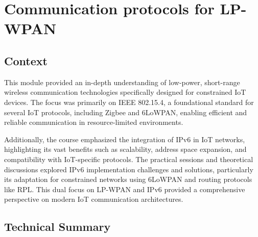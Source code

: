 \section{Communication protocols for LP-WPAN}
\subsection{Context}

\indent \indent This module provided an in-depth understanding of low-power, short-range wireless communication technologies specifically designed for constrained IoT devices. The focus was primarily on IEEE 802.15.4, a foundational standard for several IoT protocols, including Zigbee and 6LoWPAN, enabling efficient and reliable communication in resource-limited environments.
\vspace{0.25cm}

Additionally, the course emphasized the integration of IPv6 in IoT networks, highlighting its vast benefits such as scalability, address space expansion, and compatibility with IoT-specific protocols. The practical sessions and theoretical discussions explored IPv6 implementation challenges and solutions, particularly its adaptation for constrained networks using 6LoWPAN and routing protocols like RPL. This dual focus on LP-WPAN and IPv6 provided a comprehensive perspective on modern IoT communication architectures.

\subsection{Technical Summary}

